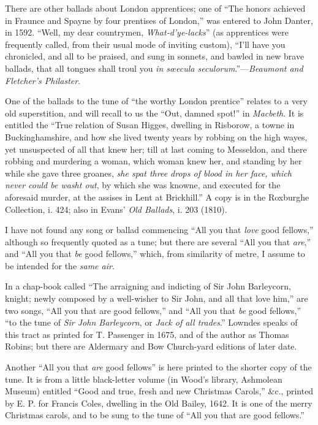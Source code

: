 There are other ballads about London apprentices; one of “The honors achiev\-ed
in Fraunce and Spayne by four prentises of London,” was entered to John
Danter, in 1592. “Well, my dear countrymen, \textit{What-d’ye-lacks}” (as apprentices
were frequently called, from their usual mode of inviting custom), “I’ll have you
chronicled, and all to be praised, and sung in sonnets, and bawled in new brave
ballads, that all tongues shall troul you \textit{in sœecula seculorum}.”—\textit{Beaumont and
Fletcher's Philaster}.

One of the ballads to the tune of “the worthy London prentice” relates
to a very old superstition, and will recall to us the “Out, damned spot!” in
\textit{Macbeth}. It is entitled the “True relation of Susan Higges, dwelling in Risborow,
a towne in Buckinghamshire, and how she lived twenty years by robbing
on the high wayes, yet unsuspected of all that knew her; till at last coming to
Messeldon, and there robbing and murdering a woman, which woman knew her,
and standing by her while she gave three groanes, \textit{she spat three drops of blood in
her face, which never could be washt out}, by which she was knowne, and executed
for the aforesaid murder, at the assises in Lent at Brickhill.” A copy is in the
Roxburghe Collection, i. 424; also in Evans’ \textit{Old Ballads}, i. 203 (1810).

I have not found any song or ballad commencing “All you that \textit{love} good
fellows,” although so frequently quoted as a tune; but there are several “All you
that \textit{are},” and “All you that \textit{be} good fellows,” which, from similarity of metre,
I assume to be intended for the \textit{same air}.

In a chap-book called “The arraigning and indicting of Sir John Barleycorn,
knight; newly composed by a well-wisher to Sir John, and all that love him,” are
two songs, “All you that are good fellows,” and “All you that \textit{be} good fellows,”
“to the tune of \textit{Sir John Barleycorn}, or \textit{Jack of all trades}.” Lowndes speaks of
this tract as printed for T. Passenger in 1675, and of the author as Thomas
Robins; but there are Aldermary and Bow Church-yard editions of later date.

Another “All you that \textit{are} good fellows” is here printed to the shorter copy of
the tune. It is from a little black-letter volume (in Wood’s library, Ashmolean
Museum) entitled “Good and true, fresh and new Christmas Carols,” \&c.,
printed by E. P. for Francis Coles, dwelling in the Old Bailey, 1642. It is one
of the merry Christmas carols, and to \pagebreak be sung to the tune of “All you that
are good fellows.”

